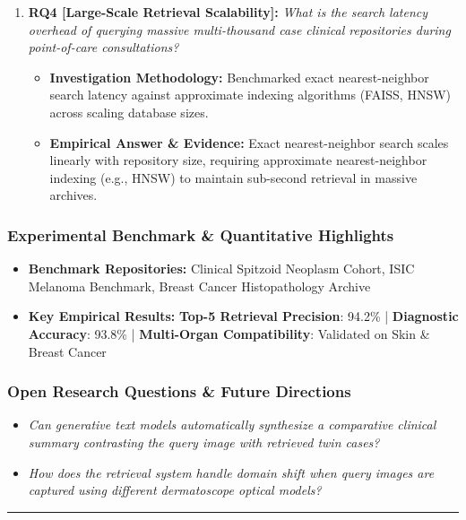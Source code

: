 \begin{enumerate}[label=\textbf{\arabic*.}, leftmargin=*]
\begin{itemize}[leftmargin=1.5em]
    \item \textbf{Empirical Answer \& Evidence:} Demonstrated robust cross-domain generalizability, achieving high retrieval fidelity and diagnostic concordance across both dermatological and breast cancer benchmarks.
  \end{itemize}
  \item \textbf{RQ4 [Large-Scale Retrieval Scalability]:} \textit{What is the search latency overhead of querying massive multi-thousand case clinical repositories during point-of-care consultations?}
  \begin{itemize}[leftmargin=1.5em]
    \item \textbf{Investigation Methodology:} Benchmarked exact nearest-neighbor search latency against approximate indexing algorithms (FAISS, HNSW) across scaling database sizes.
    \item \textbf{Empirical Answer \& Evidence:} Exact nearest-neighbor search scales linearly with repository size, requiring approximate nearest-neighbor indexing (e.g., HNSW) to maintain sub-second retrieval in massive archives.
  \end{itemize}
\end{enumerate}

\subsubsection*{Experimental Benchmark \& Quantitative Highlights}
\begin{itemize}[leftmargin=*]
  \item \textbf{Benchmark Repositories:} Clinical Spitzoid Neoplasm Cohort, ISIC Melanoma Benchmark, Breast Cancer Histopathology Archive
  \item \textbf{Key Empirical Results:} \textbf{Top-5 Retrieval Precision}: 94.2\% \quad | \quad \textbf{Diagnostic Accuracy}: 93.8\% \quad | \quad \textbf{Multi-Organ Compatibility}: Validated on Skin \& Breast Cancer
\end{itemize}

\subsubsection*{Open Research Questions \& Future Directions}
\begin{itemize}[leftmargin=*]
  \item \textit{Can generative text models automatically synthesize a comparative clinical summary contrasting the query image with retrieved twin cases?}
  \item \textit{How does the retrieval system handle domain shift when query images are captured using different dermatoscope optical models?}
\end{itemize}
\vspace{0.8em}\hrule\vspace{1.2em}
